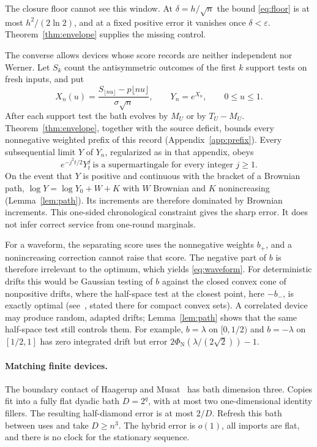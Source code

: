 \documentclass[11pt]{article}
\theoremstyle{definition}
\theoremstyle{remark}
\newcommand{\Ncdf}{\Phi_{\mathrm N}}
\newcommand{\eps}{\varepsilon}
\begin{document}
The closure floor cannot see this window. At $\delta=h/\sqrt n$ the bound \eqref{eq:floor} is at most $h^2/(2\ln2)$, and at a fixed positive error it vanishes once $\delta<\eps$. Theorem~\ref{thm:envelope} supplies the missing control.

The converse allows devices whose score records are neither independent nor Werner. Let $S_k$ count the antisymmetric outcomes of the first $k$ support tests on fresh inputs, and put
\[
 X_n(u)=\frac{S_{\lfloor nu\rfloor}-p\lfloor nu\rfloor}{\sigma\sqrt n},\qquad
 Y_n=e^{X_n},\qquad 0\le u\le1.
\]
After each support test the bath evolves by $M_U$ or by $T_U-M_U$. Theorem~\ref{thm:envelope}, together with the source deficit, bounds every nonnegative weighted prefix of this record (Appendix~\ref{app:prefix}). Every subsequential limit $Y$ of $Y_n$, regularized as in that appendix, obeys
\begin{equation}\label{eq:power-sm}
 e^{-j^2t/2}Y_t^j\ \text{is a supermartingale for every integer }j\ge1.
\end{equation}
On the event that $Y$ is positive and continuous with the bracket of a Brownian path, $\log Y=\log Y_0+W+K$ with $W$ Brownian and $K$ nonincreasing (Lemma~\ref{lem:path}). Its increments are therefore dominated by Brownian increments. This one-sided chronological constraint gives the sharp error. It does not infer correct service from one-round marginals.

For a waveform, the separating score uses the nonnegative weights $b_+$, and a nonincreasing correction cannot raise that score. The negative part of $b$ is therefore irrelevant to the optimum, which yields \eqref{eq:waveform}. For deterministic drifts this would be Gaussian testing of $b$ against the closed convex cone of nonpositive drifts, where the half-space test at the closest point, here $-b_-$, is exactly optimal (see~\cite[Section~2.3.1]{GJN}, stated there for compact convex sets). A correlated device may produce random, adapted drifts; Lemma~\ref{lem:path} shows that the same half-space test still controls them. For example, $b=\lambda$ on $[0,1/2)$ and $b=-\lambda$ on $[1/2,1]$ has zero integrated drift but error $2\Ncdf(\lambda/(2\sqrt2))-1$.

\paragraph{Matching finite devices.}
The boundary contact of Haagerup and Musat~\cite[Theorem~5.6(1)]{HM2015} has bath dimension three. Copies fit into a fully flat dyadic bath $D=2^q$, with at most two one-dimensional identity fillers. The resulting half-diamond error is at most $2/D$. Refresh this bath between uses and take $D\ge n^3$. The hybrid error is $o(1)$, all imports are flat, and there is no clock for the stationary sequence.
\end{document}
